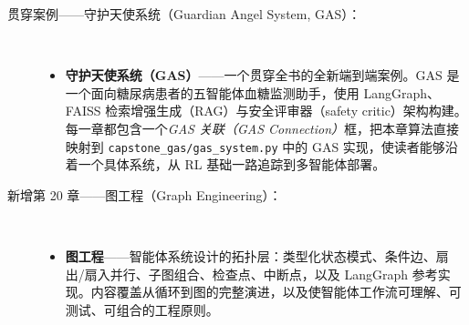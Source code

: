 \documentclass[11pt,a4paper,openany]{book}
\begin{document}
\begin{description}
  \item[贯穿案例——守护天使系统（Guardian Angel System, GAS）：]~
    \begin{itemize}
      \item \textbf{守护天使系统（GAS）}——一个贯穿全书的全新端到端案例。GAS 是一个面向糖尿病患者的五智能体血糖监测助手，使用 LangGraph、FAISS 检索增强生成（RAG）与安全评审器（safety critic）架构构建。每一章都包含一个\emph{GAS 关联（GAS Connection）}框，把本章算法直接映射到 \texttt{capstone\_gas/gas\_system.py} 中的 GAS 实现，使读者能够沿着一个具体系统，从 RL 基础一路追踪到多智能体部署。
    \end{itemize}

  \item[新增第 20 章——图工程（Graph Engineering）：]~
    \begin{itemize}
      \item \textbf{图工程}——智能体系统设计的拓扑层：类型化状态模式、条件边、扇出/扇入并行、子图组合、检查点、中断点，以及 LangGraph 参考实现。内容覆盖从循环到图的完整演进，以及使智能体工作流可理解、可测试、可组合的工程原则。
    \end{itemize}


\end{description}
\end{document}
